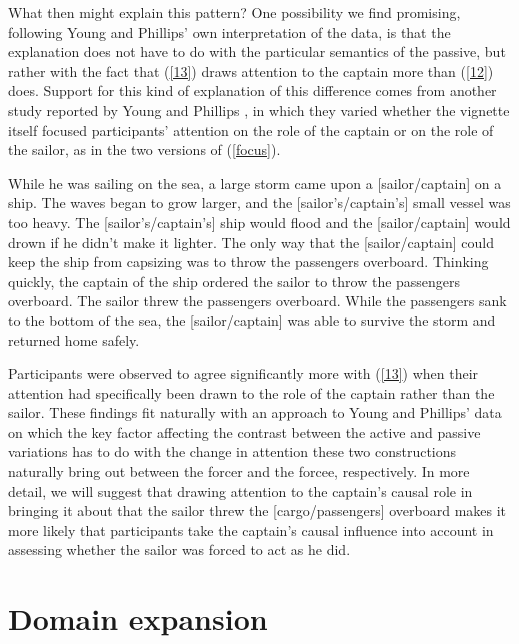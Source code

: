 \documentclass{salt}
\newcommand{\reff}[1]{(\ref{#1})}
\begin{document}
What then might explain this pattern? One possibility we find promising, following Young and Phillips' own interpretation of the data, is that the explanation does not have to do with the particular semantics of the passive, but rather with the fact that \reff{13} draws attention to the captain more than \reff{12} does. Support for this kind of explanation of this difference comes from another study reported by Young and Phillips \citeyearpar{young2011paradox}, in which they varied whether the vignette itself focused participants' attention on the role of the captain or on the role of the sailor, as in the two versions of \reff{focus}.

\begin{exe}\ex While he was sailing on the sea, a large storm came upon a [sailor/captain] on a ship. The waves began to grow larger, and the [sailor's/captain's] small vessel was too heavy. The [sailor's/captain's] ship would flood and the [sailor/captain] would drown if he didn't make it lighter. The only way that the [sailor/captain] could keep the ship from capsizing was to throw the passengers overboard. Thinking	quickly, the captain of the ship ordered the sailor to throw the passengers overboard. The sailor threw the passengers overboard. While the passengers sank to the bottom of the sea, the [sailor/captain] was able to survive the storm and returned home safely.
\label{focus}\end{exe}

\noindent Participants were observed to agree significantly more with \reff{13} when their attention had specifically been drawn to the role of the captain rather than the sailor. These findings fit naturally with an approach to Young and Phillips' data on which the key factor affecting the contrast between the active and passive variations has to do with the change in attention these two constructions naturally bring out between the forcer and the forcee, respectively. In more detail, we will suggest that drawing attention  to the captain's causal role in bringing it about that the sailor threw the [cargo/passengers] overboard makes it more likely that participants take the captain's causal influence into account in assessing whether the sailor was forced to act as he did. 



\section{Domain expansion}\label{sec:part2}
\end{document}
